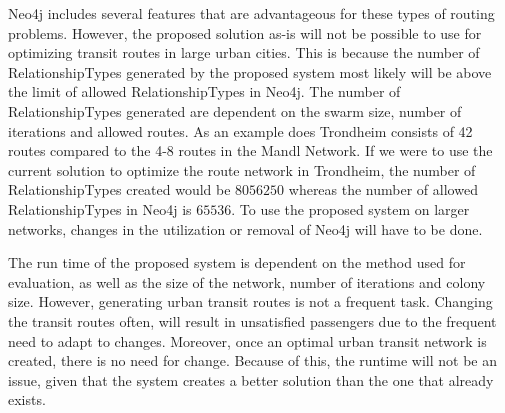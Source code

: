Neo4j includes several features that are advantageous for these types of routing problems. However, the proposed solution as-is will not be possible to use for optimizing transit routes in large urban cities. This is because the number of RelationshipTypes generated by the proposed system most likely will be above the limit of allowed RelationshipTypes in  Neo4j. The number of RelationshipTypes generated are dependent on the swarm size, number of iterations and allowed routes. As an example does Trondheim consists of 42 routes compared to the 4-8 routes in the Mandl Network. If we were to use the current solution to optimize the route network in Trondheim, the number of RelationshipTypes created would be $8056250$ whereas the number of allowed RelationshipTypes in Neo4j is $65536$. To use the proposed system on larger networks, changes in the utilization or removal of  Neo4j will have to be done. 

The run time of the proposed system is dependent on the method used for evaluation, as well as the size of the network, number of iterations and colony size. However, generating urban transit routes is not a frequent task. Changing the transit routes often, will result in unsatisfied passengers due to the frequent need to adapt to changes. Moreover, once an optimal urban transit network is created, there is no need for change. Because of this, the runtime will not be an issue, given that the system creates a better solution than the one that already exists. 

